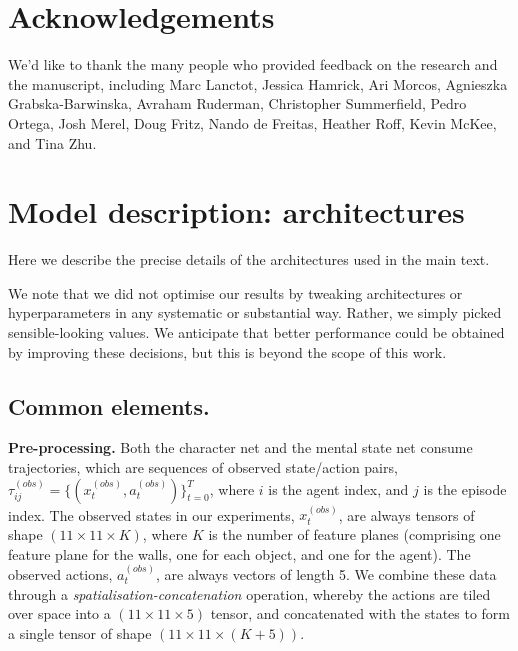 \documentclass{article}
\begin{document}

\section*{Acknowledgements}

We'd like to thank the many people who provided feedback on the research and the manuscript, including Marc Lanctot, Jessica Hamrick, Ari Morcos, Agnieszka Grabska-Barwinska, Avraham Ruderman, Christopher Summerfield, Pedro Ortega, Josh Merel, Doug Fritz, Nando de Freitas, Heather Roff, Kevin McKee, and Tina Zhu.






\clearpage
\appendix
\appendixpage
\section{Model description: architectures}
\label{appendix:tomnet}	

Here we describe the precise details of the architectures used in the main text.

We note that we did not optimise our results by tweaking architectures or hyperparameters in any systematic or substantial way. Rather, we simply picked sensible-looking values. We anticipate that better performance could be obtained by improving these decisions, but this is beyond the scope of this work.

\subsection{Common elements.}

{\bf Pre-processing.} Both the character net and the mental state net consume trajectories, which are sequences of observed state/action pairs, $\tau_{ij}^{(obs)} = \{(x_t^{(obs)}, a_t^{(obs)})\}_{t=0}^{T}$, where $i$ is the agent index, and $j$ is the episode index. The observed states in our experiments, $x_t^{(obs)}$, are always tensors of shape $(11 \times 11 \times K)$, where $K$ is the number of feature planes (comprising one feature plane for the walls, one for each object, and one for the agent). The observed actions, $a_t^{(obs)}$, are always vectors of length 5. We combine these data through a {\it spatialisation-concatenation} operation, whereby the actions are tiled over space into a $(11 \times 11 \times 5)$ tensor, and concatenated with the states to form a single tensor of shape $(11 \times 11 \times (K+5))$.
\end{document}
